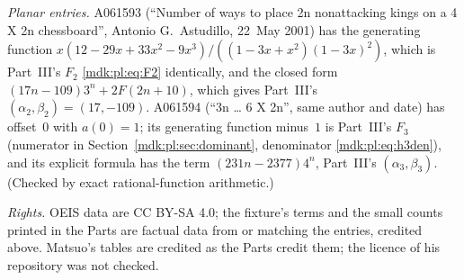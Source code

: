 \documentclass[11pt,letterpaper]{article}
\numberwithin{equation}{section}
\theoremstyle{remark}\newtheorem{remark}[theorem]{Remark}
\begin{document}
\emph{Planar entries.} A061593 (``Number of ways to place 2n nonattacking kings on a 4 X 2n chessboard'', Antonio G.~Astudillo, 22~May 2001) has the generating function $x(12-29x+33x^2-9x^3)/((1-3x+x^2)(1-3x)^2)$, which is Part~III's $F_2$ \eqref{mdk:pl:eq:F2} identically, and the closed form $(17n-109)3^n+2F(2n+10)$, which gives Part~III's $(\alpha_2,\beta_2)=(17,-109)$. A061594 (``3n \dots{} 6 X 2n'', same author and date) has offset~0 with $a(0)=1$; its generating function minus~$1$ is Part~III's $F_3$ (numerator in Section~\ref{mdk:pl:sec:dominant}, denominator \eqref{mdk:pl:eq:h3den}), and its explicit formula has the term $(231n-2377)4^n$, Part~III's $(\alpha_3,\beta_3)$. (Checked by exact rational-function arithmetic.)

\emph{Rights.} OEIS data are CC BY-SA 4.0; the fixture's terms and the small counts printed in the Parts are factual data from or matching the entries, credited above. Matsuo's tables are credited as the Parts credit them; the licence of his repository was not checked.
\end{document}
